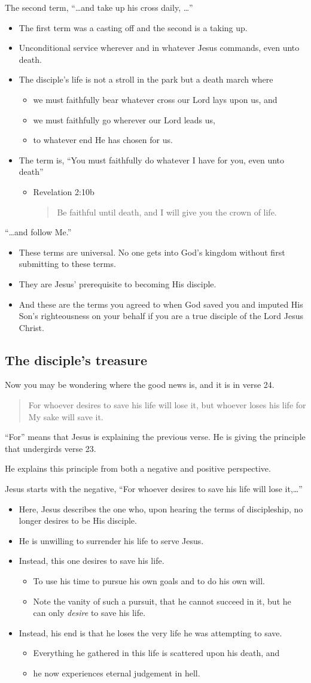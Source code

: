 \documentclass[12pt]{article}
\newcommand{\BI}{\begin{itemize}}
\newcommand{\EI}{\end{itemize}}
\newcommand{\I}{\item}
\newcommand{\Q}[1]{\begin{quote} #1 \end{quote}}
\begin{document}
\I  The second term, ``\ldots and take up his cross daily, \ldots''
\BI \I  The first term was a casting off and the second is a taking up.
    \I  Unconditional service wherever and in whatever Jesus commands,
            even unto death. 
    \I  The disciple's life is not a stroll in the park but a death march where
    \BI \I  we must faithfully bear whatever cross our Lord lays upon us, and
        \I  we must faithfully go wherever our Lord leads us, 
        \I  to whatever end He has chosen for us. \EI
    \I  The term is, ``You must faithfully do whatever I have for you,
            even unto death''
    \BI \I  Revelation 2:10b
            \Q{ Be faithful until death, and I will give you the crown of life.} \EI
\EI

\I  ``\ldots and follow Me.''
\BI \I  These terms are universal. 
        No one gets into God's kingdom without first submitting to these terms. 
    \I  They are Jesus' prerequisite to becoming His disciple.
    \I  And these are the terms you agreed to when 
            God saved you and imputed His Son's righteousness on your behalf
            if you are a true disciple of the Lord Jesus Christ. \EI

\subsection{The disciple's treasure}
\I  Now you may be wondering where the good news is,
        and it is in verse 24.
\Q{ For whoever desires to save his life will lose it,
    but whoever loses his life for My sake will save it.}
\I  ``For'' means that Jesus is explaining the previous verse.
    He is giving the principle that undergirds verse 23.
\I  He explains this principle from both a negative and positive
        perspective.

\I  Jesus starts with the negative,
    ``For whoever desires to save his life will lose it,\ldots''
\BI \I  Here, Jesus describes the one who, 
            upon hearing the terms of discipleship,
            no longer desires to be His disciple.
    \I  He is unwilling to surrender his life to serve Jesus.
    \I  Instead, this one desires to save his life.
    \BI \I  To use his time to pursue his own goals and to do his own will. 
        \I  Note the vanity of such a pursuit, that he cannot succeed in it,
                but he can only \emph{desire} to save his life. \EI
    \I  Instead, his end is that he loses the very life 
            he was attempting to save.
    \BI \I  Everything he gathered in this life is scattered upon his death, and
        \I  he now experiences eternal judgement in hell. \EI
    \EI
\end{document}
